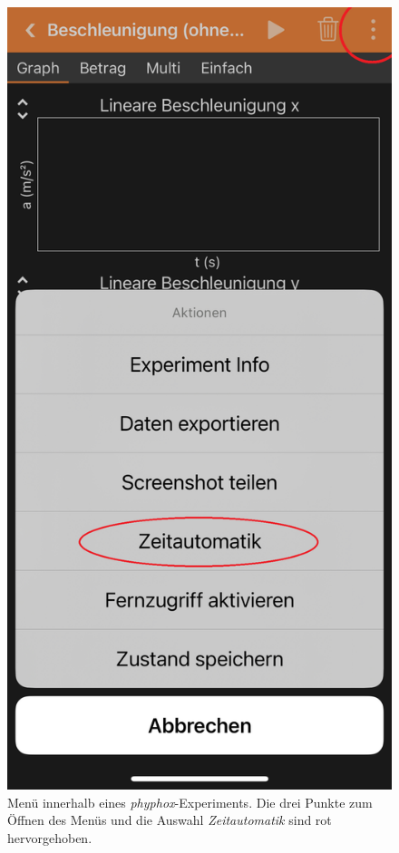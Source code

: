 \documentclass[12pt]{scrbook}
\begin{document}
\begin{figure}[ht]
    \center
    \includegraphics[scale=0.2]{Zeitautomatik.png}
    \caption{Menü innerhalb eines \textit{phyphox}-Experiments. Die drei Punkte zum Öffnen des Menüs und die Auswahl \textit{Zeitautomatik} sind rot hervorgehoben.}
    \label{zeitautomatikphyphox}
\end{figure}
\end{document}
